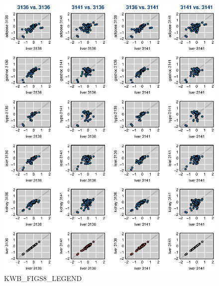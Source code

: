 \documentclass[letterpaper,twoside]{article}
\begin{document}
\begin{figure}[p]
\centerline{\includegraphics{SuppFigs/figS8.eps}}

\caption{KWB_FIGS8_LEGEND}
\end{figure}


\clearpage
\end{document}
